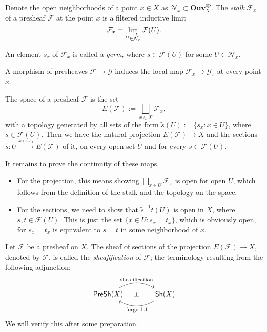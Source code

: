 \begin{definition}
    Denote the open neighborhoods of a point $x\in X$ as $\mathcal{N}_x\subset\mathbf{Ouv}_X^\mathrm{op}$.
    The \emph{stalk} $\mathcal{F}_x$ of a presheaf $\mathcal{F}$ at the point $x$ is a filtered inductive limit
    $$\mathcal{F}_x=\varinjlim_{U\in\mathcal{N}_x}\mathcal{F}(U).$$

    An element $s_x$ of $\mathcal{F}_x$ is called a \emph{germ}, where $s\in\mathcal{F}(U)$ for some $U\in\mathcal{N}_x$.
\end{definition}

A morphism of presheaves $\mathcal{F}\to\mathcal{G}$ induces the local map $\mathcal{F}_x\to\mathcal{G}_x$ at every point $x$.

\begin{definition}
    The \etale space of a presheaf $\mathcal{F}$ is the set
    $$E(\mathcal{F}):=\bigsqcup_{x\in X}\mathcal{F}_x,$$
    with a topology generated by all sets of the form $\tilde s(U):=\{s_x:x\in U\}$, where $s\in\mathcal{F}(U)$. Then we have the natural projection $E(\mathcal{F})\to X$ and the sections $\tilde s:U\xrightarrow{x\mapsto s_x}E(\mathcal{F})$ of it, on every open set $U$ and for every $s\in\mathcal{F}(U)$.

    It remains to prove the continuity of these maps. 
    \begin{itemize}
        \item For the projection, this means showing $\bigsqcup_{x\in U}\mathcal{F}_x$ is open for open $U$, which follows from the definition of the stalk and the topology on the \etale space.
        \item For the sections, we need to show that $\tilde s^{-1}\tilde t(U)$ is open in $X$, where $s,t\in\mathcal{F}(U)$. This is just the set $\{x\in U:s_x=t_x\}$, which is obviously open, for $s_x=t_x$ is equivalent to $s=t$ in some neighborhood of $x$. 
    \end{itemize}
\end{definition}

\begin{theorem}[Sheafification]\label{sheafification}
    Let $\mathcal{F}$ be a presheaf on $X$. The sheaf of sections of the projection $E(\mathcal{F})\to X$, denoted by $\tilde{\mathcal{F}}$, is called the \emph{sheafification} of $\mathcal{F}$; the terminology resulting from the following adjunction:
    \[ \begin{tikzcd}[column sep=large]
        \mathsf{PreSh}(X) \arrow[r, bend left, "\text{sheafification}"{name=U}] & \mathsf{Sh}(X) \arrow[l, bend left, "\text{forgetful}"{name=D}] \arrow[phantom, from=U, to=D, sloped, "\dashv"]
    \end{tikzcd} \]
    We will verify this after some preparation.
\end{theorem}

